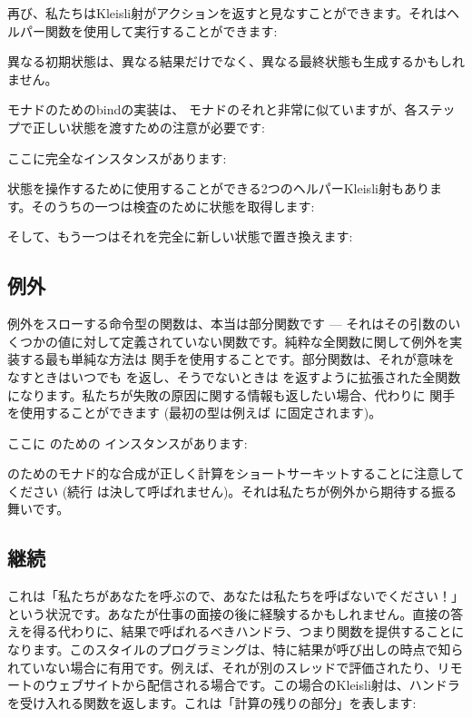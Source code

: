 再び、私たちはKleisli射がアクションを返すと見なすことができます。それはヘルパー関数を使用して実行することができます: 

異なる初期状態は、異なる結果だけでなく、異なる最終状態も生成するかもしれません。

 モナドのためのbindの実装は、 モナドのそれと非常に似ていますが、各ステップで正しい状態を渡すための注意が必要です: 

ここに完全なインスタンスがあります: 

状態を操作するために使用することができる2つのヘルパーKleisli射もあります。そのうちの一つは検査のために状態を取得します: 

そして、もう一つはそれを完全に新しい状態で置き換えます: 


\subsection{例外}

例外をスローする命令型の関数は、本当は部分関数です --- それはその引数のいくつかの値に対して定義されていない関数です。純粋な全関数に関して例外を実装する最も単純な方法は  関手を使用することです。部分関数は、それが意味をなすときはいつでも  を返し、そうでないときは  を返すように拡張された全関数になります。私たちが失敗の原因に関する情報も返したい場合、代わりに  関手を使用することができます (最初の型は例えば  に固定されます)。

ここに  のための  インスタンスがあります: 

 のためのモナド的な合成が正しく計算をショートサーキットすることに注意してください (続行  は決して呼ばれません)。それは私たちが例外から期待する振る舞いです。

\subsection{継続}

これは「私たちがあなたを呼ぶので、あなたは私たちを呼ばないでください！」という状況です。あなたが仕事の面接の後に経験するかもしれません。直接の答えを得る代わりに、結果で呼ばれるべきハンドラ、つまり関数を提供することになります。このスタイルのプログラミングは、特に結果が呼び出しの時点で知られていない場合に有用です。例えば、それが別のスレッドで評価されたり、リモートのウェブサイトから配信される場合です。この場合のKleisli射は、ハンドラを受け入れる関数を返します。これは「計算の残りの部分」を表します: 

